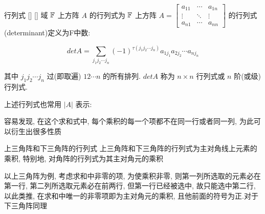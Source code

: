 \documentclass[UTF8]{ctexart}
\DeclareMathOperator{\0}{\mathbf{0}}
\DeclareMathOperator{\<}{\langle}
\renewcommand{\>}{\rangle}
\begin{document}
		\begin{dfn}
			[]
			{行列式}
			[]
			[]
            域 \(\operatorname{\mathbb{F}}\) 上方阵 \(A\) 的行列式为
			 \(\operatorname{\mathbb{F}}\) 上方阵  \(A = \begin{bmatrix} a_{11} & \cdots & a_{1n} \\ \vdots & \ddots & \vdots \\ a_{n1} & \cdots & a_{nn} \end{bmatrix}\)  的行列式(determinant)定义为F中数: 

            \[det A = \sum_{j_1 j_2 \cdots j_n} (-1)^{\tau(j_1 j_2 \cdots j_n)} a_{1j_1} a_{2j_2} \cdots a_{nj_n}\]

            其中  \(j_1 j_2 \cdots j_n\)  过(即取遍) \(12 \cdots n\) 的所有排列.  \(detA\)  称为  \(n \times n\)  行列式或  \(n\)  阶(或级)行列式.

            上述行列式也常用 \(|A|\) 表示:

		\end{dfn}

        容易发现, 在这个求和式中, 每个乘积的每一个项都不在同一行或者同一列, 为此可以衍生出很多性质

        \begin{ppt}
            {上三角阵和下三角阵的行列式}
            上三角阵和下三角阵的行列式为主对角线上元素的乘积, 特别地, 对角阵的行列式为其主对角元的乘积
        \end{ppt}

        \begin{prf}
            以上三角阵为例, 考虑求和中非零的项, 为使乘积非零, 则第一列所选取的元素必在第一行, 第二列所选取元素必在前两行, 但第一行已经被选中, 故只能选中第二行, 以此类推, 在求和中唯一的非零项即为主对角元的乘积, 且他前面的符号为正.对于下三角阵同理
        \end{prf}
	
\end{document}
